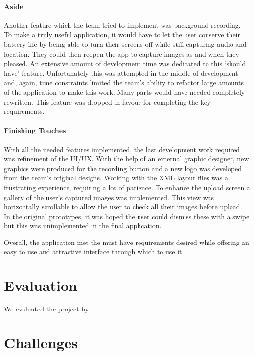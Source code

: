 \documentclass{l3proj}
\begin{document}
\subsubsection{Aside}
Another feature which the team tried to implement was background recording. To make a truly useful application, it would have to let the user conserve their battery life by being able to turn their screens off while still capturing audio and location. They could then reopen the app to capture images as and when they pleased. An extensive amount of development time was dedicated to this ‘should have’ feature. Unfortunately this was attempted in the middle of development and, again, time constraints limited the team's ability to refactor large amounts of the application to make this work. Many parts would have needed completely rewritten. This feature was dropped in favour for completing the key requirements.

\subsubsection{Finishing Touches}
With all the needed features implemented, the last development work required was refinement of the UI/UX. With the help of an external graphic designer, new graphics were produced for the recording button and a new logo was developed from the team's original designs. Working with the XML layout files was a frustrating experience, requiring a lot of patience. To enhance the upload screen a gallery of the user's captured images was implemented. This view was horizontally scrollable to allow the user to check all their images before upload. In the original prototypes, it was hoped the user could dismiss these with a swipe but this was unimplemented in the final application.

Overall, the application met the must have requirements desired while offering an easy to use and attractive interface through which to use it.

\chapter{Evaluation}

We evaluated the project by...

\chapter{Challenges}
\label{Challenges}
\end{document}
